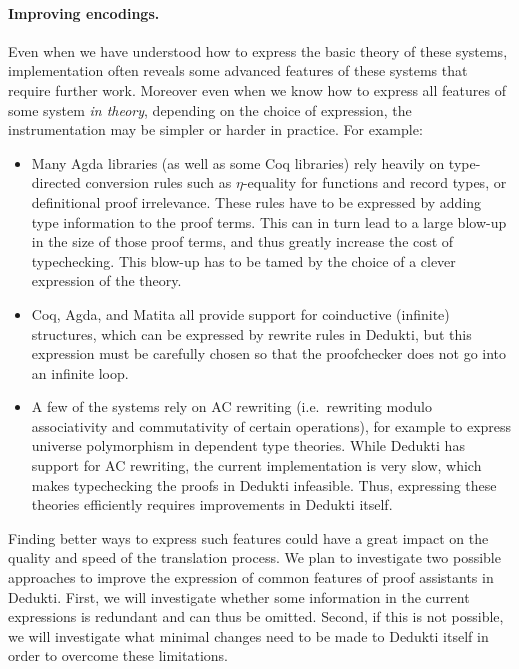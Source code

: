 \paragraph*{Improving encodings.}
Even when we have understood how to express the basic theory of these
systems, implementation often reveals some advanced features of these
systems that require further work.  Moreover even when we know how to
express all features of some system \emph{in theory}, depending on the
choice of expression, the instrumentation may be simpler or harder in
practice. For example:
\begin{itemize}

\item Many Agda libraries (as well as some Coq libraries) rely heavily
  on type-directed conversion rules such as $\eta$-equality for functions
  and record types, or definitional proof irrelevance. These rules
  have to be expressed by adding type information to the
  proof terms. This can in turn lead to a large blow-up in the size of
  those proof terms, and thus greatly increase the cost of
  typechecking. This blow-up has to be tamed by the choice of a
  clever expression of the theory.

\item Coq, Agda, and Matita all provide support for coinductive
  (infinite) structures, which can be expressed by rewrite rules in
  Dedukti, but this expression must be carefully chosen so that the
  proofchecker does not go into an infinite loop.

\item A few of the systems rely on AC rewriting (i.e.~rewriting modulo
  associativity and commutativity of certain operations), for example
  to express universe polymorphism in dependent type theories. While
  Dedukti has support for AC rewriting, the current implementation is
  very slow, which makes typechecking the proofs in Dedukti
  infeasible. Thus, expressing these theories efficiently requires improvements in
  Dedukti itself.
\end{itemize}

Finding better ways to express such features could have a great impact
on the quality and speed of the translation process.  We plan to
investigate two possible approaches to improve the expression of
common features of proof assistants in Dedukti. First, we will
investigate whether some information in the current expressions is
redundant and can thus be omitted. Second, if this is not possible, we
will investigate what minimal changes need to be made to Dedukti
itself in order to overcome these limitations.

